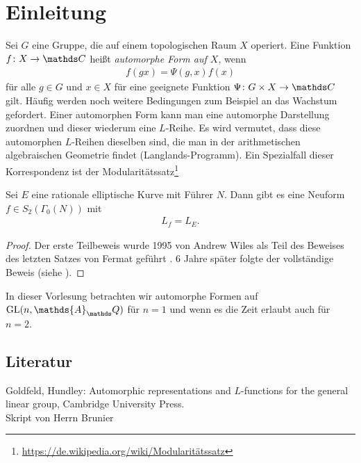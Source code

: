 \chapter*{Einleitung}
Sei $G$ eine Gruppe, die auf einem topologischen Raum $X$ operiert.
Eine Funktion $f\colon X \to \C$ heißt \emph{automorphe Form auf $X$}, wenn
\begin{align*}
f(gx)=  \Psi(g,x) f(x)
\end{align*}
für alle $g\in G$ und $x\in X$ für eine geeignete Funktion $\Psi \colon G \times X \to \C $ gilt.
Häufig werden noch weitere Bedingungen zum Beispiel an das Wachstum gefordert.
Einer automorphen Form kann man eine automorphe Darstellung zuordnen und dieser wiederum eine $L$-Reihe.
Es wird vermutet, dass diese automorphen $L$-Reihen dieselben sind, die man in der arithmetischen algebraischen Geometrie findet (Langlands-Programm).
Ein Spezialfall dieser Korrespondenz ist der Modularitätssatz\footnote{\href{https://de.wikipedia.org/wiki/Modularit\%C3\%A4tssatz}{https://de.wikipedia.org/wiki/Modularitätssatz}}
\begin{satz}
Sei $E$ eine rationale elliptische Kurve mit Führer $N$.
Dann gibt es eine Neuform $f\in S_2(\Gamma_0(N))$ mit
\begin{align*}
L_f=L_E.
\end{align*}
\end{satz}
\begin{proof}
Der erste Teilbeweis wurde 1995 von Andrew Wiles als Teil des Beweises des letzten Satzes von Fermat geführt \cite{Wiles}.
6 Jahre später folgte der vollständige Beweis (siehe \cite{Breuil}).
\end{proof}
In dieser Vorlesung betrachten wir automorphe Formen auf $\GL(n,\mathds{A}_\Q)$ für $n=1$ und wenn es die Zeit erlaubt auch für $n=2$.

\section*{Literatur}
Goldfeld, Hundley: Automorphic representations and $L$-functions for the general linear group, Cambridge University Press.\\
Skript von Herrn Brunier